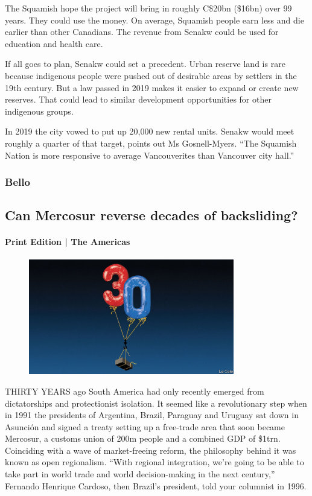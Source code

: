 \documentclass{article}
\begin{document}
The Squamish hope the project will bring in roughly C\$20bn (\$16bn) over 99 years. They could use the money. On average, Squamish people earn less and die earlier than other Canadians. The revenue from Senakw could be used for education and health care. 

If all goes to plan, Senakw could set a precedent. Urban reserve land is rare because indigenous people were pushed out of desirable areas by settlers in the 19th century. But a law passed in 2019 makes it easier to expand or create new reserves. That could lead to similar development opportunities for other indigenous groups. 

In 2019 the city vowed to put up 20,000 new rental units. Senakw would meet roughly a quarter of that target, points out Ms Gosnell-Myers. ``The Squamish Nation is more responsive to average Vancouverites than Vancouver city hall.''{} 
\clearpage
\subsubsection{Bello }
\subsection{Can Mercosur reverse decades of backsliding? }
\paragraph{Print Edition | The Americas  \quad \color{gray}{Mar 25th 2021 }}
\begin{figure}[h]
\centering
\includegraphics[width=0.8\textwidth]{images/20210327_AMD001_0.jpg}
\end{figure}
\lettrine{T}HIRTY YEARS ago South America had only recently emerged from dictatorships and protectionist isolation. It seemed like a revolutionary step when in 1991 the presidents of Argentina, Brazil, Paraguay and Uruguay sat down in Asunción and signed a treaty setting up a free-trade area that soon became Mercosur, a customs union of 200m people and a combined GDP of \$1trn. Coinciding with a wave of market-freeing reform, the philosophy behind it was known as open regionalism. ``With regional integration, we're going to be able to take part in world trade and world decision-making in the next century,'' Fernando Henrique Cardoso, then Brazil's president, told your columnist in 1996. 
\end{document}
